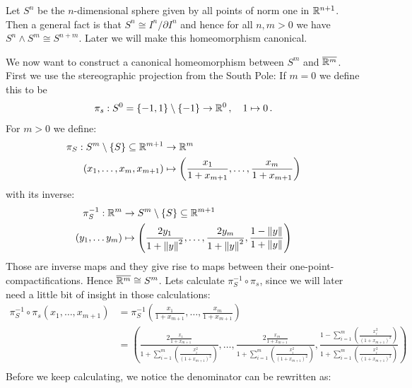 \begin{example}
	Let $S^n$ be the $n$-dimensional sphere given by all points of norm one in $\mathbb{R}^{n+1}$. Then a general fact is that $S^n\cong I^n\big/ \partial I^n$ and hence for all $n,m>0$ we have $S^n\wedge S^m\cong S^{n+m}$. Later  we will make this homeomorphism canonical.
\end{example}

\begin{definition}\label{def:orient-fromRelaSpaceToTheSphere}
    We now want to construct a canonical homeomorphism between $S^m$ and $\overline{\mathbb{R}^m}$. First we use the stereographic projection from the South Pole: If $m=0$ we define this to be 
	\begin{equation*}
		\pi_s:S^0=\{-1,1\} \setminus \{-1\} \to \mathbb{R}^0\,,\quad 1\mapsto 0\,.
	\end{equation*} For $m>0$ we define:
	    \begin{align*}
        \pi_S:S^m\setminus \{S\}\subseteq \mathbb{R}^{m+1} &\to       \mathbb{R}^m\\
        (x_1,\dots,x_m,x_{m+1})                            &\mapsto   \left(\frac{x_1}{1+x_{m+1}},\dots, \frac{x_m}{1+x_{m+1}} \right)
    \end{align*} with its inverse: 
    \begin{align*}
        \pi_S^{-1}:\mathbb{R}^m       &\to     S^m\setminus\{S\}\subseteq \mathbb{R}^{m+1}\\
        (y_1,\dots y_m)       &\mapsto  \left(\frac{2y_1}{1+\left\lVert y\right\rVert^2},\dots,\frac{2y_m}{1+\left\lVert y\right\rVert^2},\frac{1-\left\lVert y\right\rVert}{1+\left\lVert y\right\rVert} \right)
    \end{align*}
    Those are inverse maps and they give rise to maps between their one-point-compactifications. Hence $\overline{\mathbb{R}^m}\cong S^m$. Lets calculate $\pi_S^{-1}\circ \pi_s$, since we will later need a little bit of insight in those calculations:
    \begin{align*}
        \pi_S^{-1}\circ \pi_s(x_1,\dots ,x_{m+1})
        &= \pi_S^{-1}\left(\frac{x_1}{1+x_{m+1}},\dots, \frac{x_m}{1+x_{m+1}} \right)\\
        &= \left(\frac{2\frac{x_1}{1+x_{m+1}}}{1+\sum_{i=1}^m(\frac{x_i^2}{(1+x_{m+1})^2})},\dots, \frac{2\frac{x_m}{1+x_{m+1}}}{1+\sum_{i=1}^m(\frac{x_i^2}{(1+x_{m+1})^2})},\frac{1-\sum_{i=1}^m(\frac{x_i^2}{(1+x_{m+1})^2})}{1+\sum_{i=1}^m(\frac{x_i^2}{(1+x_{m+1})^2})} \right)\\
    \end{align*} Before we keep calculating, we notice the denominator can be rewritten as:

\end{definition}
